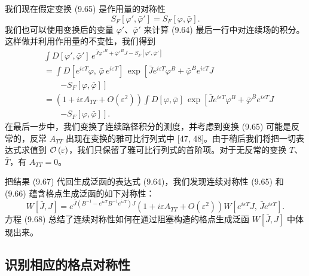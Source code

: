 我们现在假定变换 (9.65) 是作用量的对称性
\begin{equation}
  S_F[\varphi',\bar\varphi'] = S_F[\varphi,\bar\varphi] .
\end{equation}
我们也可以使用变换后的变量 $\varphi'$、$\bar\varphi'$ 来计算 (9.64) 最后一行中对连续场的积分。这样做并利用作用量的不变性，我们得到
\begin{align}
  &\int D[\varphi',\bar\varphi']\,e^{\bar J\varphi'^B + \bar\varphi'^B J - S_F[\varphi',\bar\varphi']} \nonumber\\
  &= \int D\left[e^{i\varepsilon T}\varphi,\,\bar\varphi\,e^{i\varepsilon T}\right]\,
     \exp\!\left[\bar J e^{i\varepsilon T}\varphi^B
       + \bar\varphi^B e^{i\varepsilon T}J\right. \nonumber\\
  &\qquad \left.- S_F[\varphi,\bar\varphi]\right] \nonumber\\
  &= \left(1 + i\varepsilon A_{TT} + O(\varepsilon^2)\right)
     \int D[\varphi,\bar\varphi]\,
     \exp\!\left[\bar J e^{i\varepsilon T}\varphi^B
       + \bar\varphi^B e^{i\varepsilon T}J\right. \nonumber\\
  &\qquad \left.- S_F[\varphi,\bar\varphi]\right] .
\end{align}
在最后一步中，我们变换了连续路径积分的测度，并考虑到变换 (9.65) 可能是反常的，反常 $A_{TT}$ 出现在变换的雅可比行列式中 [47, 48]。由于稍后我们将把一切表达式求值到 $\mathcal{O}\left(\varepsilon\right)$，我们只保留了雅可比行列式的首阶项。对于无反常的变换 $T$、$\bar T$，有 $A_{TT} = 0$。

把结果 (9.67) 代回生成泛函的表达式 (9.64)，我们发现连续对称性 (9.65) 和 (9.66) 蕴含格点生成泛函的如下对称性：
\begin{equation}
  W[\bar J,J] = e^{\bar J\left(B^{-1} - e^{i\varepsilon T}B^{-1}e^{i\varepsilon T}\right)J}
    \left(1 + i\varepsilon A_{TT} + O(\varepsilon^2)\right)
    W\left[e^{i\varepsilon T}J,\,\bar J e^{i\varepsilon T}\right] .
\end{equation}
方程 (9.68) 总结了连续对称性如何在通过阻塞构造的格点生成泛函 $W[\bar J,J]$ 中体现出来。

\subsection{识别相应的格点对称性}
\label{sec:9.4.2}

